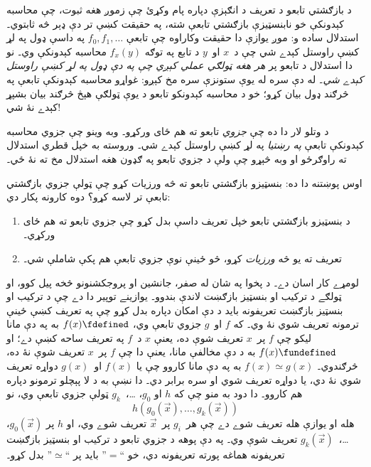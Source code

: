 \documentclass[../../../include/open-logic-section]{subfiles}
\begin{document}


د بازګشتي تابعو د تعريف د انګېزې دپاره پام وکړئ چې زموږ هغه ثبوت، چې
محاسبه کېدونکې خو نابنسټيزې بازګشتي تابعې شته، په حقيقت کښې تر دې ډېر
څه ثابتوي۔ استدلال ساده و: موږ يوازې دا حقيقت وکاراوه چې تابعې
$f_0,f_1,\dots$ په داسې ډول په لړ کښې راوستل کېدے شي چې د~$x$ او~$y$
د تابع په توګه $f_x(y)$ محاسبه کېدونکې وي۔ نو دا استدلال د تابعو پر
\emph{هر هغه ټولګي عملي کېږي چې په دې ډول په لړ کښې راوستل کېدے شي}۔
له دې سره له يوې ستونزې سره مخ کېږو: غواړو محاسبه کېدونکې تابعې په
څرګند ډول بيان کړو؛ خو د محاسبه کېدونکو تابعو د يوې ټولګې هېڅ څرګند
بيان بشپړ کېدے نۀ شي!

د وتلو لار دا ده چې \emph{جزوي} تابعو ته هم ځای ورکړو۔ وبه وينو چې
جزوي محاسبه کېدونکې تابعې \emph{په رښتيا} په لړ کښې راوستل کېدے شي۔
 وروسته به خپل قطري
استدلال ته راوګرځو او وبه څېړو چې ولې د جزوي تابعو په ګډون هغه استدلال
مخ ته نۀ ځي۔

اوس پوښتنه دا ده: بنسټيزو بازګشتي تابعو ته څه ورزيات کړو چې ټولې جزوي
بازګشتي تابعې تر لاسه کړو؟ دوه کارونه پکار دي:
\begin{enumerate}
\item د بنسټيزو بازګشتي تابعو خپل تعريف داسې بدل کړو چې جزوي تابعو ته
  هم ځای ورکړي۔
\item تعريف ته يو څه \emph{ورزيات} کړو، څو ځينې نوې جزوي تابعې هم پکې
  شاملې شي۔
\end{enumerate}

لومړے کار اسان دے۔ د پخوا په شان له صفر، جانشين او پروجکشنونو څخه پيل
کوو، او ټولګے د ترکيب او بنسټيز بازګښت لاندې بندوو۔ يوازينے توپير دا
دے چې د ترکيب او بنسټيز بازګښت تعريفونه بايد د دې امکان دپاره بدل کړو
چې په تعريف کښې ځينې ترمونه تعريف شوي نۀ وي۔ که $f$ او~$g$ جزوي تابعې
وي، $f(x) \fdefined$ به په دې مانا ليکو چې $f$ پر~$x$ تعريف شوې ده،
يعنې $x$ د~$f$ په تعريف ساحه کښې دے؛ او $f(x) \fundefined$ به د دې
مخالفې مانا، يعنې دا چې $f$ پر~$x$ تعريف شوې نۀ ده، څرګندوي۔
$f(x) \simeq g(x)$ به په دې مانا کاروو چې يا $f(x)$ او~$g(x)$ دواړه
تعريف شوي نۀ دي، يا دواړه تعريف شوي او سره برابر دي۔ دا نښې به د لا
پېچلو ترمونو دپاره هم کاروو۔ دا دود به منو چې که $h$ او $g_0$،
\dots،~$g_k$ ټولې جزوي تابعې وي، نو
\[
h(g_0(\vec x),\dots,g_k(\vec x))
\]
هله او يوازې هله تعريف شوے دے چې هر~$g_i$ پر~$\vec x$ تعريف شوے وي،
او $h$ پر $g_0(\vec x)$، \dots،~$g_k(\vec x)$ تعريف شوې وي۔ په دې
پوهه د جزوي تابعو د ترکيب او بنسټيز بازګښت تعريفونه هماغه پورته
تعريفونه دي، خو ``$=$'' بايد پر ``$\simeq$'' بدل کړو۔
\end{document}
